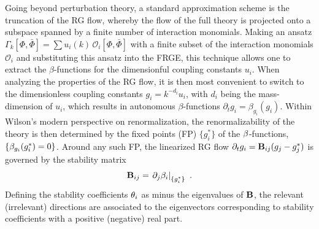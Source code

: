 \documentclass[preprint,preprintnumbers,amsmath,amssymb,nofootinbib,APS]{revtex4}
\newcommand{\be}{\begin{equation}}
\newcommand{\ee}{\end{equation}}
\newcommand{\cO}{\mathcal{O}}
\newcommand{\2}{\sqrt{2\,}}
\newcommand{\p}{\partial}
\begin{document}
Going beyond perturbation theory, a standard approximation scheme is the truncation of the RG flow, whereby the flow of the full theory is projected onto a subspace spanned by a finite number of interaction monomials. Making an ansatz $\Gamma_k[\Phi, \bar{\Phi}] = \sum u_i(k) \, \cO_i[\Phi, \bar{\Phi}]$ with a finite subset of the interaction monomials  $\cO_i$ and substituting this ansatz into the FRGE, this technique allows one to extract the $\beta$-functions for the dimensionful coupling constants $u_i$. 
When analyzing the properties of the RG flow, it is then most convenient to switch to the dimensionless coupling constants $g_i = k^{-d_i} u_i$, with $d_i$ being the mass-dimension of $u_i$, which results in autonomous $\beta$-functions $\p_t g_i = \beta_{g_i}(g_i)$.
Within Wilson's modern perspective on renormalization, the renormalizability of the theory is then determined by the fixed points (FP) $\{g_i^*\}$ of the 
$\beta$-functions, $\{\beta_{g_i}(g_i^*)=0\}$. Around any such FP, the linearized RG flow $\p_t g_i = {\bf B}_{ij} (g_j - g^*_j)$ is governed by the stability matrix 
%
\be
{\bf B}_{ij} = \left. \p_j \beta_i \right|_{\{g_i^*\}}\ .
\ee
%
Defining the stability coefficients $\theta_i$ as minus the eigenvalues of $\bf B$, the relevant (irrelevant) directions are associated to the eigenvectors
corresponding to stability coefficients with a positive (negative) real part.
\end{document}
